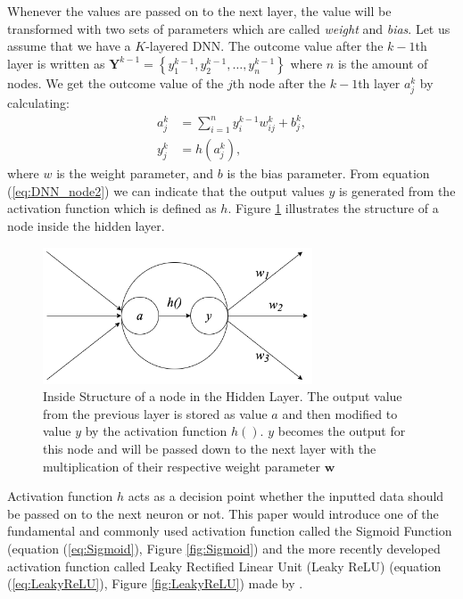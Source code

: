 Whenever the values are passed on to the next layer, the value will be transformed with two sets of parameters which are called \textit{weight} and \textit{bias}. Let us assume that we have a $K$-layered DNN. The outcome value after the $k-1$th layer is written as $\boldsymbol{Y}^{k-1}=\left\{y_{1}^{k-1}, y_{2}^{k-1}, \ldots, y_{n}^{k-1}\right\}$ where $n$ is the amount of nodes. We get the outcome value of the $j$th node after the $k-1$th layer $a_{j}^{k}$ by calculating:
\begin{align}
    a_{j}^{k} &=\sum_{i=1}^{n} y_{i}^{k-1} w_{i j}^{k}+b_{j}^{k}\label{eq:DNN_node1},\\ 
    y_{j}^{k} &=h\left(a_{j}^{k}\right),\label{eq:DNN_node2}
\end{align}
where $w$ is the weight parameter, and $b$ is the bias parameter. From equation (\ref{eq:DNN_node2}) we can indicate that the output values $\textit{y}$ is generated from the activation function which is defined as $h$. Figure \ref{fig:hidden_layer} illustrates the structure of a node inside the hidden layer.
\begin{figure}[ht]
    \centering
    \includegraphics[width=8cm]{images/Hidden_Layer_Node.png}
    \caption{Inside Structure of a node in the Hidden Layer. The output value from the previous layer is stored as value $a$ and then modified to value $y$ by the activation function $h()$. $y$ becomes the output for this node and will be passed down to the next layer with the multiplication of their respective weight parameter $\textbf{w}$}
    \label{fig:hidden_layer}
\end{figure}

Activation function $h$ acts as a decision point whether the inputted data should be passed on to the next neuron or not. This paper would introduce one of the fundamental and commonly used activation function called the Sigmoid Function (equation (\ref{eq:Sigmoid}), Figure \ref{fig:Sigmoid}) and the more recently developed activation function called Leaky Rectified Linear Unit (Leaky ReLU) (equation (\ref{eq:LeakyReLU}), Figure \ref{fig:LeakyReLU}) made by \citet{LeakyReLU}.

